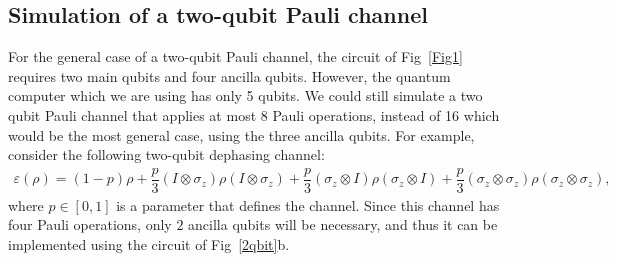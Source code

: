 \documentclass[10pt,letterpaper]{article} %
\newcommand{\fref}[1]{Fig~\ref{#1}}
\begin{document}
% 
\subsection{Simulation of a two-qubit Pauli channel} \label{2qbit-s} %
For the general case of a two-qubit Pauli channel,
the circuit of \fref{Fig1} requires two main
qubits and four ancilla qubits.
However, the quantum computer which we are using has only 5 qubits.
We could still simulate a two qubit Pauli channel that applies at most $8$ Pauli operations,
instead of 16 which would be the most general case,
using the three ancilla qubits. 
For example, consider the following two-qubit dephasing channel:
\begin{align}
\varepsilon (\rho) = (1-p) \rho + \dfrac{p}{3} (I \otimes \sigma_z) \rho (I \otimes \sigma_z) +  \dfrac{p}{3}(\sigma_z \otimes I) \rho (\sigma_z \otimes I) +  \dfrac{p}{3}(\sigma_z \otimes \sigma_z) \rho (\sigma_z \otimes \sigma_z),
\label{2qbit-c}
\end{align}
where $p \in [0,1]$ is a parameter that defines the channel. 
Since this channel has four Pauli operations, 
only $2$ ancilla qubits will be necessary, and thus it can be implemented
using the circuit of \fref{2qbit}b.
\end{document}
